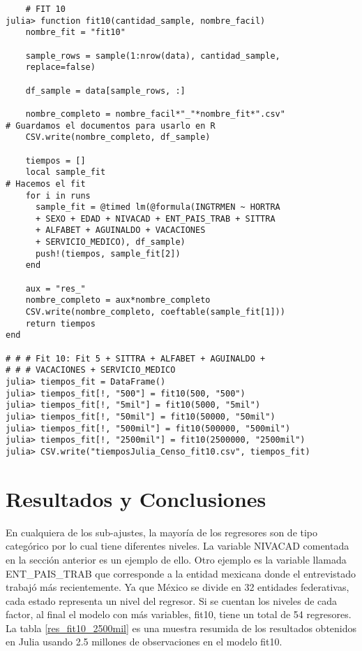 \begin{verbatim}
	# FIT 10
julia> function fit10(cantidad_sample, nombre_facil)
	nombre_fit = "fit10"

	sample_rows = sample(1:nrow(data), cantidad_sample, 
	replace=false)

	df_sample = data[sample_rows, :]

	nombre_completo = nombre_facil*"_"*nombre_fit*".csv"
# Guardamos el documentos para usarlo en R
	CSV.write(nombre_completo, df_sample)

	tiempos = []
	local sample_fit
# Hacemos el fit
	for i in runs
	  sample_fit = @timed lm(@formula(INGTRMEN ~ HORTRA 
	  + SEXO + EDAD + NIVACAD + ENT_PAIS_TRAB + SITTRA 
	  + ALFABET + AGUINALDO + VACACIONES 
	  + SERVICIO_MEDICO), df_sample)   
	  push!(tiempos, sample_fit[2])
	end  

	aux = "res_"
	nombre_completo = aux*nombre_completo
	CSV.write(nombre_completo, coeftable(sample_fit[1]))
	return tiempos
end 

# # # Fit 10: Fit 5 + SITTRA + ALFABET + AGUINALDO + 
# # # VACACIONES + SERVICIO_MEDICO
julia> tiempos_fit = DataFrame()
julia> tiempos_fit[!, "500"] = fit10(500, "500")
julia> tiempos_fit[!, "5mil"] = fit10(5000, "5mil")
julia> tiempos_fit[!, "50mil"] = fit10(50000, "50mil")
julia> tiempos_fit[!, "500mil"] = fit10(500000, "500mil")
julia> tiempos_fit[!, "2500mil"] = fit10(2500000, "2500mil")
julia> CSV.write("tiemposJulia_Censo_fit10.csv", tiempos_fit)

\end{verbatim}

\section{Resultados y Conclusiones}

En cualquiera de los sub-ajustes, la mayoría de los regresores son de tipo categórico por lo cual tiene diferentes niveles. La variable \textsf{NIVACAD} comentada en la sección anterior es un ejemplo de ello. Otro ejemplo es la variable llamada \textsf{ENT\_PAIS\_TRAB} que corresponde a la entidad mexicana donde el entrevistado trabajó más recientemente. Ya que México se divide en 32 entidades federativas, cada estado representa un nivel del regresor.  Si se cuentan los niveles de cada factor, al final el modelo con más variables, \textsf{fit10}, tiene un total de 54 regresores. La tabla \ref{res_fit10_2500mil} es una muestra resumida de los resultados obtenidos en \textsf{Julia} usando 2.5 millones de observaciones en el modelo \textsf{fit10}.  


